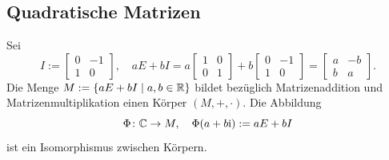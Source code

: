 \newpage
\subsection{Quadratische Matrizen}
\begin{Satz}
Sei
\[I:=\begin{bmatrix}
0 & -1\\
1 & 0
\end{bmatrix},\quad
aE+bI = a\begin{bmatrix}1 & 0\\ 0 & 1\end{bmatrix}
+b\begin{bmatrix}0 & -1\\ 1 & 0\end{bmatrix}
=
\begin{bmatrix}
a & -b\\
b & a
\end{bmatrix}.\]
Die Menge $M := \{aE+bI\mid a,b\in\mathbb R\}$ bildet bezüglich
Matrizenaddition und Matrizenmultiplikation einen
Körper $(M,+,\cdot)$. Die Abbildung
\[\Phi\colon\mathbb C\to M,\quad \Phi(a+b\mathrm i):= aE+bI\]
ist ein Isomorphismus zwischen Körpern.
\end{Satz}
